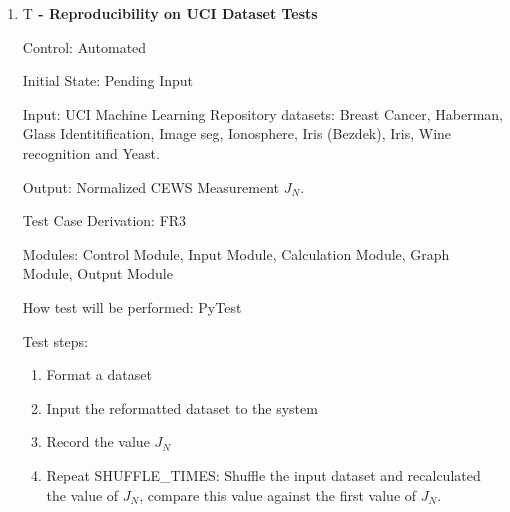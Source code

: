 \documentclass[12pt, titlepage]{article}
\newcounter{testnum} %
\begin{document}
\begin{enumerate}

\item{T\thetestnum \textbf{\label{T:repro} 
 - Reproducibility on UCI Dataset Tests}}

Control: Automated
					
Initial State: Pending Input
					
Input: UCI Machine Learning Repository datasets: Breast Cancer, Haberman, Glass Identitification, Image seg, Ionosphere, Iris (Bezdek), Iris, Wine recognition and Yeast.
					
Output: Normalized CEWS Measurement $J_N$.

Test Case Derivation: FR3

Modules: Control Module, Input Module, Calculation Module, Graph Module, Output Module
					
How test will be performed: PyTest

Test steps:
\begin{enumerate}
\item Format a dataset
\item Input the reformatted dataset to the system
\item Record the value $J_N$
\item Repeat SHUFFLE\_TIMES: Shuffle the input dataset and recalculated the value of $J_N$, compare this value against the first value of $J_N$.
\end{enumerate}

\end{enumerate}


\end{document}
